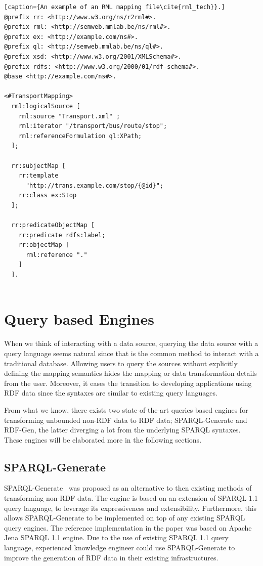\begin{lstlisting}[caption={An example of an RML mapping file\cite{rml_tech}}.]
@prefix rr: <http://www.w3.org/ns/r2rml#>.
@prefix rml: <http://semweb.mmlab.be/ns/rml#>.
@prefix ex: <http://example.com/ns#>.
@prefix ql: <http://semweb.mmlab.be/ns/ql#>.
@prefix xsd: <http://www.w3.org/2001/XMLSchema#>.
@prefix rdfs: <http://www.w3.org/2000/01/rdf-schema#>.
@base <http://example.com/ns#>.

<#TransportMapping>
  rml:logicalSource [
    rml:source "Transport.xml" ;
    rml:iterator "/transport/bus/route/stop";
    rml:referenceFormulation ql:XPath;
  ];

  rr:subjectMap [
    rr:template
      "http://trans.example.com/stop/{@id}";
    rr:class ex:Stop
  ];

  rr:predicateObjectMap [
    rr:predicate rdfs:label;
    rr:objectMap [
      rml:reference "."
    ]
  ].
    
\end{lstlisting}

\section{Query based Engines}
\label{sec:query_based_engine}
When we think of interacting with a data source, querying the data source with a 
query language seems natural since that is the common method to interact 
with a traditional database. Allowing users to query the sources without explicitly 
defining the mapping semantics hides the mapping or data transformation details from the user. 
Moreover, it eases the transition to developing applications using RDF data since the syntaxes are 
similar to existing query languages. 

From what we know, there exists two state-of-the-art queries based engines for transforming 
unbounded non-RDF data to RDF data; SPARQL-Generate and RDF-Gen, the latter diverging a lot from
the underlying SPARQL syntaxes.  
These engines will be elaborated more in the following sections. 


\subsection{SPARQL-Generate}
SPARQL-Generate~\cite{sparql_generate} was proposed as an alternative to then existing methods of 
transforming non-RDF data. The engine is based on an extension of SPARQL 1.1 query language, to leverage 
its expressiveness and extensibility. Furthermore, this allows SPARQL-Generate to be implemented on top 
of any existing SPARQL query engines. The reference implementation in the paper was based on Apache Jena 
SPARQL 1.1 engine. Due to the use of existing SPARQL 1.1 query language, experienced knowledge engineer could use 
SPARQL-Generate to improve the generation of RDF data in their existing infrastructures. 

